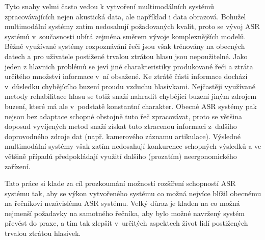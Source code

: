Tyto snahy velmi často vedou
k vytvoření multimodálních systémů zpracovávajících nejen akustická data, ale
například i data obrazová. %
Bohužel multimodální systémy zatím nedosahují požadovaných kvalit, proto se vývoj ASR systémů v~současnosti ubírá zejména směrem vývoje komplexnějších modelů.
Běžně využívané systémy rozpoznávání řeči jsou však trénovány na obecných datech a pro uživatele postižené trvalou ztrátou hlasu jsou nepoužitelné. Jako jeden z hlavnich problémů se jeví jiné charakteristiky produkované řeči a ztráta určitého množství informace v~ní obsažené. Ke ztrátě části informace dochází v~důsledku chybějícího buzení  proudu vzduchu hlasivkami. Nejčastěji využívané metody rehabilitace hlasu se totiž snaží nahradit chybějící buzení  jiným zdrojem buzení, které má ale v~podstatě konstantní charakter. Obecné ASR systémy pak nejsou bez adaptace schopné obstojně tuto řeč zpracovávat, proto se většina doposud vyvíjených metod snaží získat tuto ztracenou informaci z~dalšího doprovodného zdroje dat (např. kamerového záznamu artikulace). Výsledné multimodální systémy však zatím nedosahují konkurence schopných výsledků a ve většině případů předpokládají využití dalšího (prozatím) neergonomického zařízení.

Tato práce si klade za cíl prozkoumání možností rozšíření schopností ASR systému tak, aby se výkon vytvořeného systému co možná nejvíce blížil obecnému na řečníkovi nezávislému ASR systému. Velký důraz je kladen na co možná nejmenší požadavky na samotného řečníka, aby bylo možné navržený systém převést do praxe, a tím tak zlepšit v~určitých aspektech život lidí postižených trvalou ztrátou hlasivek.


